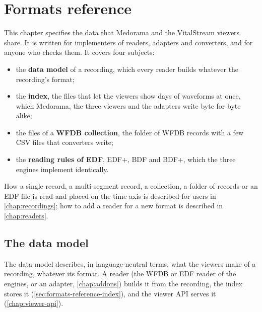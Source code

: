 \chapter{Formats reference}
\label{chap:formats-reference}

This chapter specifies the data that Medorama and the VitalStream viewers share. It is written
for implementers of readers, adapters and converters, and for anyone who checks them. It covers
four subjects:
\begin{itemize}
\item the \textbf{data model} of a recording, which every reader builds whatever the recording's
  format;
\item the \textbf{index}, the files that let the viewers show days of waveforms at once, which
  Medorama, the three viewers and the adapters write byte for byte alike;
\item the files of a \textbf{WFDB collection}, the folder of WFDB records with a few CSV files that
  converters write;
\item the \textbf{reading rules of EDF}, EDF+, BDF and BDF+, which the three engines implement
  identically.
\end{itemize}
How a single record, a multi-segment record, a collection, a folder of records or an EDF file is
read and placed on the time axis is described for users in \cref{chap:recordings}; how to add a
reader for a new format is described in \cref{chap:readers}.

\section{The data model}
\label{sec:formats-reference-model}

The data model describes, in language-neutral terms, what the viewers make of a recording,
whatever its format. A reader (the WFDB or EDF reader of the engines, or an adapter,
\cref{chap:addons}) builds it from the recording, the index stores it
(\cref{sec:formats-reference-index}), and the viewer API serves it (\cref{chap:viewer-api}).

